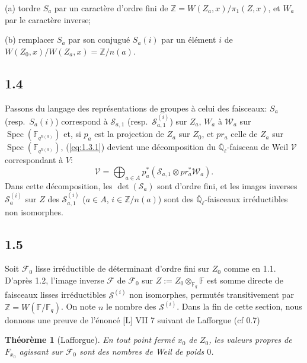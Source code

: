 \documentclass[11pt,a4paper]{article}
\theoremstyle{plain}
\newtheorem{theorem}{Th\'eor\`eme}
\theoremstyle{definition}
\DeclareMathOperator{\Spec}{Spec}
\begin{document}
(a) tordre $S_a$ par un caract\`ere d'ordre fini de $\mathbb{Z} = W(Z_a,x)/\pi_1(Z,x)$, et $W_a$ par le caract\`ere inverse;

(b) remplacer $S_a$ par son conjugu\'e $S_a(i)$ par un \'el\'ement $i$ de $W(Z_0,x)/W(Z_a,x) = \mathbb{Z}/n(a)$.

\subsection{1.4}

Passons du langage des repr\'esentations de groupes \`a celui des faisceaux: $S_a$ (resp.~$S_a(i)$) correspond \`a $\mathcal{S}_{a,1}$ (resp.~$\mathcal{S}_{a,1}^{(i)}$) sur $Z_a$, $W_a$ \`a $\mathcal{W}_a$ sur $\Spec(\mathbb{F}_{q^{n(a)}})$ et, si $p_a$ est la projection de $Z_a$ sur $Z_0$, et $pr_a$ celle de $Z_a$ sur $\Spec(\mathbb{F}_{q^{n(a)}})$, (\ref{eq:1.3.1}) devient une d\'ecomposition du $\overline{\mathbb{Q}}_\ell$-faisceau de Weil $\mathcal{V}$ correspondant \`a $V$:
\begin{equation}\label{eq:1.4.1}
\mathcal{V} = \bigoplus_{a \in A} p_a^*(\mathcal{S}_{a,1} \otimes pr_a^* \mathcal{W}_a).
\end{equation}
Dans cette d\'ecomposition, les $\det(\mathcal{S}_a)$ sont d'ordre fini, et les images inverses $\mathcal{S}_a^{(i)}$ sur $Z$ des $\mathcal{S}_{a,1}^{(i)}$ ($a \in A$, $i \in \mathbb{Z}/n(a)$) sont des $\overline{\mathbb{Q}}_\ell$-faisceaux irr\'eductibles non isomorphes.

\subsection{1.5}

Soit $\mathcal{F}_0$ lisse irr\'eductible de d\'eterminant d'ordre fini sur $Z_0$ comme en 1.1. D'apr\`es 1.2, l'image inverse $\mathcal{F}$ de $\mathcal{F}_0$ sur $Z := Z_0 \otimes_{\mathbb{F}_q} \mathbb{F}$ est somme directe de faisceaux lisses irr\'eductibles $\mathcal{S}^{(i)}$ non isomorphes, permut\'es transitivement par $\mathbb{Z} = W(\mathbb{F}/\mathbb{F}_q)$. On note $n$ le nombre des $\mathcal{S}^{(i)}$. Dans la fin de cette section, nous donnons une preuve de l'\'enonc\'e [L] VII 7 suivant de Lafforgue (cf 0.7)

\begin{theorem}[Lafforgue]\label{thm:1.6}
En tout point ferm\'e $x_0$ de $Z_0$, les valeurs propres de $F_{x_0}$ agissant sur $\mathcal{F}_0$ sont des nombres de Weil de poids $0$.
\end{theorem}
\end{document}
